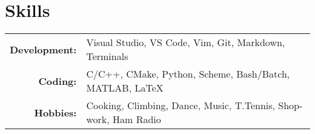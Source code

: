 \section*{\color{Blue}Skills\vspace{0.5mm}{\color{Orange}\hrule}}

\begin{tabular}{ r | l }
\textbf{Development:}   &Visual Studio, VS Code, Vim, Git, Markdown, Terminals\\
\textbf{Coding:}        &C/C++, CMake, Python, Scheme, Bash/Batch, MATLAB, \LaTeX\\
\textbf{Hobbies:}       &Cooking, Climbing, Dance, Music, T.Tennis, Shop-work, Ham Radio
\end{tabular}